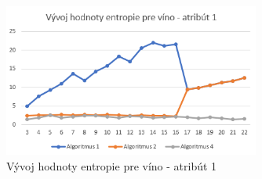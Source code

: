 \begin{figure}[ht!]
\includegraphics[width=0.75\textwidth]{obrazky/wine-vyvoj-entropie-atribut1.PNG}
\centering
\caption{Vývoj hodnoty entropie pre víno - atribút 1} 
\label{fig:structure}
\end{figure}


